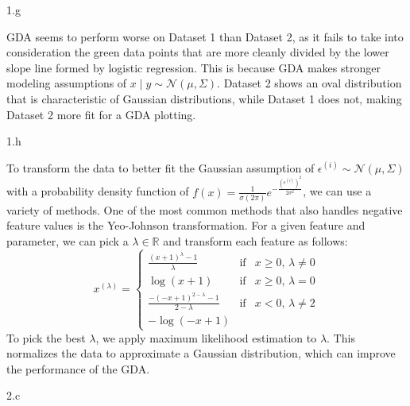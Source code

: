 \documentclass{article}
\newenvironment{answer}{\sf \begingroup\color{ForestGreen}}{\endgroup}%
\begin{document}
\LARGE
1.g
\normalsize

\begin{answer}

  GDA seems to perform worse on Dataset 1 than Dataset 2, as it fails to take into consideration the green data points that are more cleanly divided by the lower slope line formed by logistic regression. This is because GDA makes stronger modeling assumptions of $ x \mid y \sim \mathcal{N}(\mu,\Sigma)$. Dataset 2 shows an oval distribution that is characteristic of Gaussian distributions, while Dataset 1 does not, making Dataset 2 more fit for a GDA plotting.
  
\end{answer}
\clearpage

\LARGE
1.h
\normalsize

\begin{answer}

  To transform the data to better fit the Gaussian assumption of $\epsilon^{(i)} \sim \mathcal{N}(\mu,\Sigma)$ with a probability density function of $f(x)=\frac{1}{\sigma(2\pi)}e^{-\frac{(\epsilon^{(i)})^2}{2\sigma^2}}$, we can use a variety of methods. One of the most common methods that also handles negative feature values is the Yeo-Johnson transformation. For a given feature and parameter, we can pick a $\lambda \in \mathbb{R}$ and transform each feature as follows:
  \[ x^{(\lambda)} =  \left\{ \begin{array}{rcl} \frac{(x+1)^\lambda-1}{\lambda} & \text{if} & x \ge 0\text{, } \lambda \neq 0 \\ \log(x+1) & \text{if} & x \ge 0 \text{, } \lambda=0 \\  \frac{-(-x+1)^{2-\lambda}-1}{2-\lambda} & \text{if} & x < 0 \text{, } \lambda \neq 2 \\ -\log(-x+1) \end{array} \right. \]
  To pick the best $\lambda$, we apply maximum likelihood estimation to $\lambda$.
  This normalizes the data to approximate a Gaussian distribution, which can improve the performance of the GDA.
  
\end{answer}
\clearpage

\LARGE
2.c
\normalsize
\end{document}
